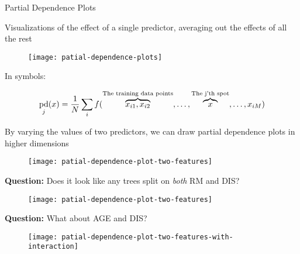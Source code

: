 \begin{frame}{Partial Dependence Plots}

Visualizations of the effect of a single predictor, averaging out the effects of all the rest

  \begin{figure}
    \texttt{[image: patial-dependence-plots]}
  \end{figure}

\end{frame}
%
\begin{frame}
In symbols:

$$ \operatorname*{pd}_j(x) = \frac{1}{N} \sum_i f(\overbrace{x_{i1}, x_{i2}}^{\text{The training data points}}, \ldots, \overbrace{x}^{\text{The j'th spot}}, \ldots, x_{iM}) $$
\end{frame}
%
\begin{frame}
By varying the values of two predictors, we can draw partial dependence plots in higher dimensions

  \begin{figure}
    \texttt{[image: patial-dependence-plot-two-features]}
  \end{figure}
 
\end{frame}
%
\begin{frame}
\textbf{Question:} Does it look like any trees split on \textit{both} RM and DIS?

  \begin{figure}
    \texttt{[image: patial-dependence-plot-two-features]}
  \end{figure}
 
\end{frame}
%
\begin{frame}
\textbf{Question:} What about AGE and DIS?

  \begin{figure}
    \texttt{[image: patial-dependence-plot-two-features-with-interaction]}
  \end{figure}
 
\end{frame}
